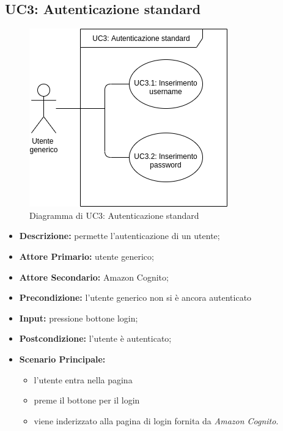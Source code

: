 \subsection{UC3: Autenticazione standard}
    \label{sec:UC3}
    \begin{figure}[!ht]
        \caption{Diagramma di UC3: Autenticazione standard}
        \vspace{10px}
        \includegraphics[scale=0.5]{../../../Images/AnalisiRequisiti/UC03}
        \centering
    \end{figure}
    \begin{itemize}
        \item \textbf{Descrizione:} permette l'autenticazione di un utente;
        \item \textbf{Attore Primario:} utente generico;
        \item \textbf{Attore Secondario:} Amazon Cognito;
        \item \textbf{Precondizione:} l'utente generico non si è ancora autenticato
        \item \textbf{Input:} pressione bottone login;
        \item \textbf{Postcondizione:} l'utente è autenticato;
        \item \textbf{Scenario Principale:} 
        \begin{itemize}
            \item l'utente entra nella pagina
            \item preme il bottone per il login
            \item viene inderizzato alla pagina di login fornita da \textit{Amazon Cognito}.
        \end{itemize}
    \end{itemize}
